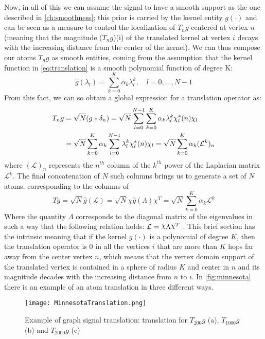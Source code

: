 Now, in all of this we can assume the signal to have a smooth support as the one described in \autoref{ch:smoothness}; this prior is carried by the kernel entity  $g(\cdot)$ and can be seen as a measure to control the localization of $T_n g$ centered at vertex $n$ (meaning that the magnitude ($T_n g$)(i) of the translated kernel at vertex $i$ decays with the increasing distance from the center of the kernel). We can thus compose our atoms $T_n g$ as smooth entities, coming from the assumption that the kernel function in \autoref{eq:translation} is a smooth polynomial function of degree K:
\begin{equation}
\hat{g}(\lambda_l) = \sum_{k=0}^{K} \alpha_k\lambda_l^k, \quad l = 0,\dots,N-1
\end{equation}
From this fact, we can so obtain a global expression for a translation operator as:
\begin{align}
T_n g & = \sqrt{N}(g * \delta_n) = \sqrt{N}\sum_{l=0}^{N-1}\sum_{k=0}^{K}\alpha_k\lambda_l^k\chi_l^*(n)\chi_l \notag\\
&= \sqrt{N}\sum_{k=0}^{K}\alpha_k\sum_{l=0}^{N-1}\lambda_l^k\chi_l^*(n)\chi_l = \sqrt{N}\sum_{k=0}^{K}\alpha_k (\mathcal{L}^k)_n
\end{align}
where $(\mathcal{L})_n$ represents the $n^{th}$ column of the $k^{th}$ power of the Laplacian matrix $\mathcal{L}^k$. The final concatenation of $N$ such columns brings us to generate a set of $N$ atoms, corresponding to the columns of
\begin{equation}
Tg = \sqrt{N}\hat{g}(\mathcal{L}) = \sqrt{N}\chi \hat{g}(\Lambda)\chi^T = \sqrt{N}\sum_{k=0}^{K}\alpha_k\mathcal{L}^k
\label{eq:tg}
\end{equation}
Where the quantity $\Lambda$ corresponds to the diagonal matrix of the eigenvalues in such a way that the following relation holds: $\mathcal{L} = \rchi \Lambda \rchi^T$ \cite{Dong2016}. This brief section has the intrinsic meaning that if the kernel $g(\cdot)$ is a polynomial of degree $K$, then the translation operator is $0$ in all the vertices $i$ that are more than $K$ hops far away from the center vertex $n$, which means that the vertex domain support of the translated vertex is contained in a sphere of radius $K$ and center in $n$ and its magnitude decades with the increasing distance from $n$ to $i$.
In \autoref{fig:minnesota} there is an example of an atom translation in three different ways.

\begin{figure}[tb]
  \centering
  \texttt{[image: MinnesotaTranslation.png]}
  \caption{Example of graph signal translation: translation for $T_{200}g$ (a), $T_{1000}g$ (b) and $T_{2000}g$ (c)}
  \label{fig:minnesota}
\end{figure}

